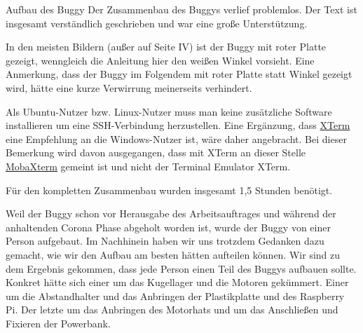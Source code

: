 \documentclass[12pt]{report}
\begin{document}
\begin{section}{Aufbau des Buggy}
Der Zusammenbau des Buggys verlief problemlos. Der Text ist insgesamt verständlich geschrieben und war eine große Unterstützung.

In den meisten Bildern (außer auf Seite IV) ist der Buggy mit roter Platte gezeigt, wenngleich die Anleitung hier den weißen Winkel vorsieht. Eine Anmerkung, dass der Buggy im Folgendem mit roter Platte statt Winkel gezeigt wird, hätte eine kurze Verwirrung meinerseits verhindert.

Als Ubuntu-Nutzer bzw. Linux-Nutzer muss man keine zusätzliche Software installieren um eine SSH-Verbindung herzustellen. Eine Ergänzung, dass \href{https://invisible-island.net/xterm/}{XTerm} eine Empfehlung an die Windows-Nutzer ist, wäre daher angebracht. Bei dieser Bemerkung wird davon ausgegangen, dass mit XTerm an dieser Stelle \href{https://mobaxterm.mobatek.net/}{MobaXterm} gemeint ist und nicht der Terminal Emulator XTerm. 

Für den kompletten Zusammenbau wurden insgesamt 1,5 Stunden benötigt.

Weil der Buggy schon vor Herausgabe des Arbeitsauftrages und während der anhaltenden Corona Phase abgeholt worden ist, wurde der Buggy von einer Person aufgebaut. Im Nachhinein haben wir uns trotzdem Gedanken dazu gemacht, wie wir den Aufbau am besten hätten aufteilen können. Wir sind zu dem Ergebnis gekommen, dass jede Person einen Teil des Buggys aufbauen sollte. Konkret hätte sich einer um das Kugellager und die Motoren gekümmert. Einer um die Abstandhalter und das Anbringen der Plastikplatte und des Raspberry Pi. Der letzte um das Anbringen des Motorhats und um das Anschließen und Fixieren der Powerbank.

\end{section}
\end{document}
